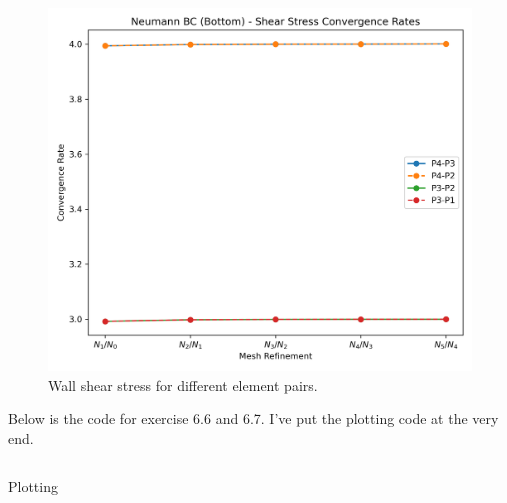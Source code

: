 \documentclass[a4paper,12pt]{article}
\theoremstyle{exerciseStyle}
\theoremstyle{solutionStyle}
\begin{document}
\begin{figure}
    \centering
    \includegraphics[width=1\linewidth]{figs/shear_stress_convergence_rates.png}
    \caption{Wall shear stress for different element pairs.}
    \label{fig:shear}
\end{figure}

\FloatBarrier

Below is the code for exercise 6.6 and 6.7. I've put the
plotting code at the very end.
\inputminted[linenos, breaklines, frame=lines]{python}{ex67.py}




\FloatBarrier

Plotting

\inputminted[linenos, breaklines]{python}{plotter.py}
\end{document}
